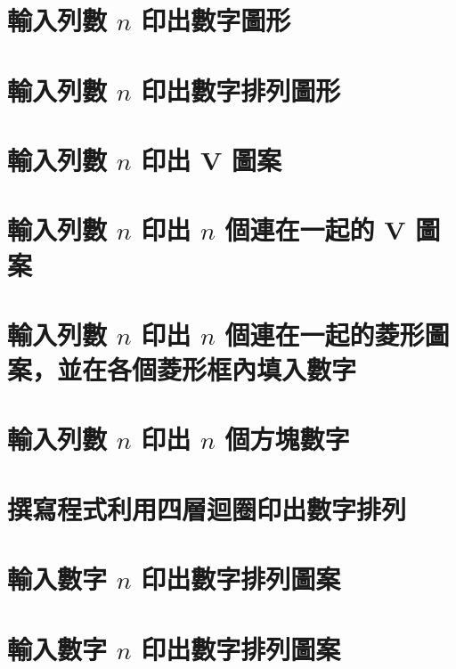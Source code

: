 \section{輸入列數 $n$ 印出數字圖形}


\section{輸入列數 $n$ 印出數字排列圖形}


\section{輸入列數 $n$ 印出 V 圖案}


\section{輸入列數 $n$ 印出 $n$ 個連在一起的 V 圖案}


\section{輸入列數 $n$ 印出 $n$ 個連在一起的菱形圖案，並在各個菱形框內填入數字}


\section{輸入列數 $n$ 印出 $n$ 個方塊數字}


\section{撰寫程式利用四層迴圈印出數字排列}


\section{輸入數字 $n$ 印出數字排列圖案}


\section{輸入數字 $n$ 印出數字排列圖案}


